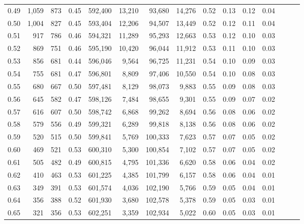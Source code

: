 \begin{tabular}{rrrrrrrrrrrrrrr}
0.49 &   1,059 &    873 &  0.45 &  592,400 &   13,210 &   93,680 &   14,276 &  0.52 &  0.13 &  0.12 &      0.04 \\
0.50 &   1,004 &    827 &  0.45 &  593,404 &   12,206 &   94,507 &   13,449 &  0.52 &  0.12 &  0.11 &      0.04 \\
0.51 &     917 &    786 &  0.46 &  594,321 &   11,289 &   95,293 &   12,663 &  0.53 &  0.12 &  0.10 &      0.03 \\
0.52 &     869 &    751 &  0.46 &  595,190 &   10,420 &   96,044 &   11,912 &  0.53 &  0.11 &  0.10 &      0.03 \\
0.53 &     856 &    681 &  0.44 &  596,046 &    9,564 &   96,725 &   11,231 &  0.54 &  0.10 &  0.09 &      0.03 \\
0.54 &     755 &    681 &  0.47 &  596,801 &    8,809 &   97,406 &   10,550 &  0.54 &  0.10 &  0.08 &      0.03 \\
0.55 &     680 &    667 &  0.50 &  597,481 &    8,129 &   98,073 &    9,883 &  0.55 &  0.09 &  0.08 &      0.03 \\
0.56 &     645 &    582 &  0.47 &  598,126 &    7,484 &   98,655 &    9,301 &  0.55 &  0.09 &  0.07 &      0.02 \\
0.57 &     616 &    607 &  0.50 &  598,742 &    6,868 &   99,262 &    8,694 &  0.56 &  0.08 &  0.06 &      0.02 \\
0.58 &     579 &    556 &  0.49 &  599,321 &    6,289 &   99,818 &    8,138 &  0.56 &  0.08 &  0.06 &      0.02 \\
0.59 &     520 &    515 &  0.50 &  599,841 &    5,769 &  100,333 &    7,623 &  0.57 &  0.07 &  0.05 &      0.02 \\
0.60 &     469 &    521 &  0.53 &  600,310 &    5,300 &  100,854 &    7,102 &  0.57 &  0.07 &  0.05 &      0.02 \\
0.61 &     505 &    482 &  0.49 &  600,815 &    4,795 &  101,336 &    6,620 &  0.58 &  0.06 &  0.04 &      0.02 \\
0.62 &     410 &    463 &  0.53 &  601,225 &    4,385 &  101,799 &    6,157 &  0.58 &  0.06 &  0.04 &      0.01 \\
0.63 &     349 &    391 &  0.53 &  601,574 &    4,036 &  102,190 &    5,766 &  0.59 &  0.05 &  0.04 &      0.01 \\
0.64 &     356 &    388 &  0.52 &  601,930 &    3,680 &  102,578 &    5,378 &  0.59 &  0.05 &  0.03 &      0.01 \\
0.65 &     321 &    356 &  0.53 &  602,251 &    3,359 &  102,934 &    5,022 &  0.60 &  0.05 &  0.03 &      0.01 \\

\end{tabular}
